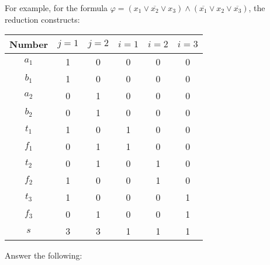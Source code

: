 \documentclass[11pt,addpoints]{exam}
\begin{document}
\begin{questions}
  For example, for the formula $\varphi = (x_1 \vee \overline{x_2} \vee x_3) \wedge (\overline{x_1} \vee x_2 \vee \overline{x_3})$, the reduction constructs:
  \begin{center}
    \begin{tabular}{| c | c | c | c | c | c |}
      \hline
      Number & $j=1$ & $j=2$ & $i=1$ & $i=2$ & $i = 3$ \\ \hline \hline
      $a_1$ & 1 & 0 & 0 & 0 & 0 \\ \hline
      $b_1$ & 1 & 0 & 0 & 0 & 0 \\ \hline
      $a_2$ & 0 & 1 & 0 & 0 & 0 \\ \hline
      $b_2$ & 0 & 1 & 0 & 0 & 0 \\ \hline \hline
      $t_1$ & 1 & 0 & 1 & 0 & 0 \\ \hline
      $f_1$ & 0 & 1 & 1 & 0 & 0 \\ \hline \hline
      $t_2$ & 0 & 1 & 0 & 1 & 0 \\ \hline
      $f_2$ & 1 & 0 & 0 & 1 & 0 \\ \hline \hline
      $t_3$ & 1 & 0 & 0 & 0 & 1 \\ \hline
      $f_3$ & 0 & 1 & 0 & 0 & 1 \\ \hline \hline
      $s$   & 3 & 3 & 1 & 1 & 1 \\ \hline
    \end{tabular}
  \end{center}

  \pagebreak

  Answer the following:
\end{questions}
\end{document}
